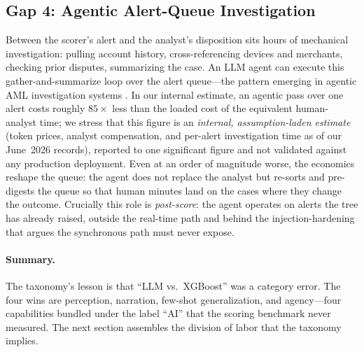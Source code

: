 \subsection{Gap 4: Agentic Alert-Queue Investigation}
\label{sec:p8-gap-agentic}

Between the scorer's alert and the analyst's disposition sits hours of
mechanical investigation: pulling account history, cross-referencing devices
and merchants, checking prior disputes, summarizing the case. An LLM agent can
execute this gather-and-summarize loop over the alert queue---the pattern
emerging in agentic AML investigation systems \citep{naik2025coinvestigator,
pirmorad2025icl_aml}. In our internal estimate, an agentic pass over one alert
costs roughly $85\times$ less than the loaded cost of the equivalent
human-analyst time; we stress that this figure is an \emph{internal, assumption-laden
estimate} (token prices, analyst compensation, and per-alert
investigation time as of our June~2026 records), reported to one significant
figure and not validated against any production deployment. Even at an order
of magnitude worse, the economics reshape the queue: the agent does not
replace the analyst but re-sorts and pre-digests the queue so that human
minutes land on the cases where they change the outcome. Crucially this role
is \emph{post-score}: the agent operates on alerts the tree has already
raised, outside the real-time path and behind the injection-hardening that
 argues the synchronous path must never expose.

\paragraph{Summary.} The taxonomy's lesson is that ``LLM vs.\ XGBoost'' was a
category error. The four wins are perception, narration, few-shot
generalization, and agency---four capabilities bundled under the label ``AI''
that the scoring benchmark never measured. The next section assembles the
division of labor that the taxonomy implies.
